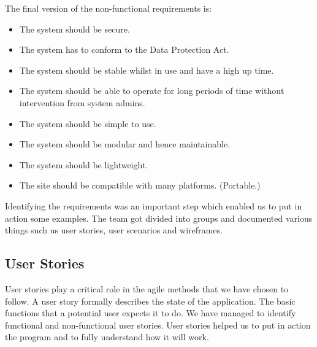 \documentclass{l3proj}
\begin{document}
The final version of the non-functional requirements is:

\begin{itemize}

\item The system should be secure.

\item The system has to conform to the Data Protection Act.

\item The system should be stable whilst in use and have a high up time.

\item The system should be able to operate for long periods of time without intervention from system admins.

\item The system should be simple to use.

\item The system should be modular and hence maintainable.

\item The system should be lightweight.

\item The site should be compatible with many platforms. (Portable.)

\end{itemize}

Identifying the requirements was an important step which enabled us to put in action some examples. The team got divided into groups and documented various things such us user stories, user scenarios and wireframes. 

\subsection{User Stories}
\label{user_stories}

User stories play a critical role in the agile methods that we have chosen to follow. A user story formally describes the state of the application. The basic functions that a potential user expects it to do. We have managed to identify functional and non-functional user stories. User stories helped us to put in action the program and to fully understand how it will work.
\end{document}
